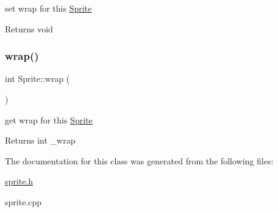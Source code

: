 set wrap for this \hyperlink{class_sprite}{Sprite} 

\begin{DoxyReturn}{Returns}
void 
\end{DoxyReturn}
\mbox{\label{class_sprite_a5b8eb7dc4c186c951ebf1b424cdda27f}} 
\subsubsection{\texorpdfstring{wrap()}{wrap()}\hspace{0.1cm}{\footnotesize\ttfamily [2/2]}}
{\footnotesize\ttfamily int Sprite\+::wrap (\begin{DoxyParamCaption}{ }\end{DoxyParamCaption})\hspace{0.3cm}{\ttfamily [inline]}}



get wrap for this \hyperlink{class_sprite}{Sprite} 

\begin{DoxyReturn}{Returns}
int \+\_\+wrap 
\end{DoxyReturn}


The documentation for this class was generated from the following files\+:\begin{DoxyCompactItemize}
\item 
\hyperlink{sprite_8h}{sprite.\+h}\item 
sprite.\+cpp\end{DoxyCompactItemize}
